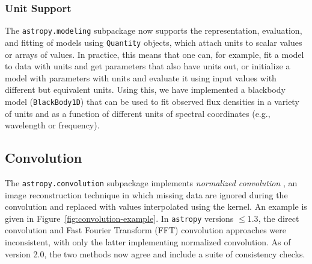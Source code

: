 \documentclass[modern]{aastex61}
\newcommand{\package}[1]{\texttt{#1}\xspace}
\newcommand{\astropypkg}{\package{astropy}}
\renewcommand{\figurename}{Figure\xspace}
\begin{document}
\subsubsection{Unit Support}

The \package{astropy.modeling} subpackage now supports the representation, evaluation, and fitting of models using \texttt{Quantity} objects, which attach units to scalar values or arrays of values. In practice, this means that one can, for example, fit a model to data with units and get parameters that also have units out, or initialize a model with parameters with units and evaluate it using input values with different but equivalent units. Using this, we have implemented a blackbody model (\texttt{BlackBody1D}) that can be used to fit observed flux densities in a variety of units and as a function of different units of spectral coordinates (e.g., wavelength or frequency).

\subsection{Convolution}

The \package{astropy.convolution} subpackage implements
\textit{normalized convolution} \citep[e.g.,][]{Knutsson1993}, an image
reconstruction technique in which missing data are ignored during the
convolution and replaced with values interpolated using the kernel.
An example is given in \figurename~\ref{fig:convolution-example}.
In \astropypkg versions $\leq 1.3$, the direct convolution and Fast Fourier Transform (FFT)
convolution approaches were inconsistent, with only the latter implementing
normalized convolution.
As of version 2.0, the two methods now agree and include a suite of
consistency checks.
\end{document}
